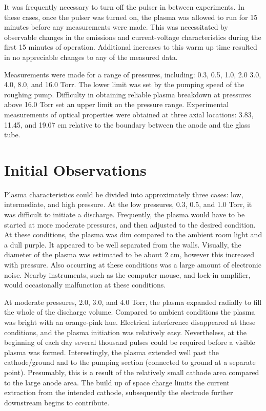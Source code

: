 It was frequently necessary to turn off the pulser in between experiments. In
these cases, once the pulser was turned on, the plasma was allowed to run for 15
minutes before any measurements were made. This was necessitated by observable
changes in the emissions and current-voltage characteristics during the first 15
minutes of operation. Additional increases to this warm up time resulted in no
appreciable changes to any of the measured data.

Measurements were made for a range of pressures, including: 0.3, 0.5, 1.0, 2.0
3.0, 4.0, 8.0, and 16.0 Torr. The lower limit was set by the pumping speed of
the roughing pump. Difficulty in obtaining reliable plasma breakdown at
pressures above 16.0 Torr set an upper limit on the pressure range. Experimental
measurements of optical properties were obtained at three axial locations: 3.83,
11.45, and 19.07 cm relative to the boundary between the anode and the glass
tube.

\section{Initial Observations}

Plasma characteristics could be divided into approximately three cases: low,
intermediate, and high pressure. At the low pressures, 0.3, 0.5, and 1.0 Torr,
it was difficult to initiate a discharge. Frequently, the plasma would have to
be started at more moderate pressures, and then adjusted to the desired
condition. At these conditions, the plasma was dim compared to the ambient room
light and a dull purple. It appeared to be well separated from the walls.
Visually, the diameter of the plasma was estimated to be about 2 cm, however
this increased with pressure. Also occurring at these conditions was a large
amount of electronic noise. Nearby instruments, such as the computer mouse, and
lock-in amplifier, would occasionally malfunction at these conditions.

At moderate pressures, 2.0, 3.0, and 4.0 Torr, the plasma expanded radially to
fill the whole of the discharge volume. Compared to ambient conditions the
plasma was bright with an orange-pink hue. Electrical interference disappeared
at these conditions, and the plasma initiation was relatively easy.
Nevertheless, at the beginning of each day several thousand pulses could be
required before a visible plasma was formed. Interestingly, the plasma extended
well past the cathode/ground and to the pumping section (connected to ground at
a separate point). Presumably, this is a result of the relatively small cathode
area compared to the large anode area. The build up of space charge limits the
current extraction from the intended cathode, subsequently the electrode further
downstream begins to contribute.

